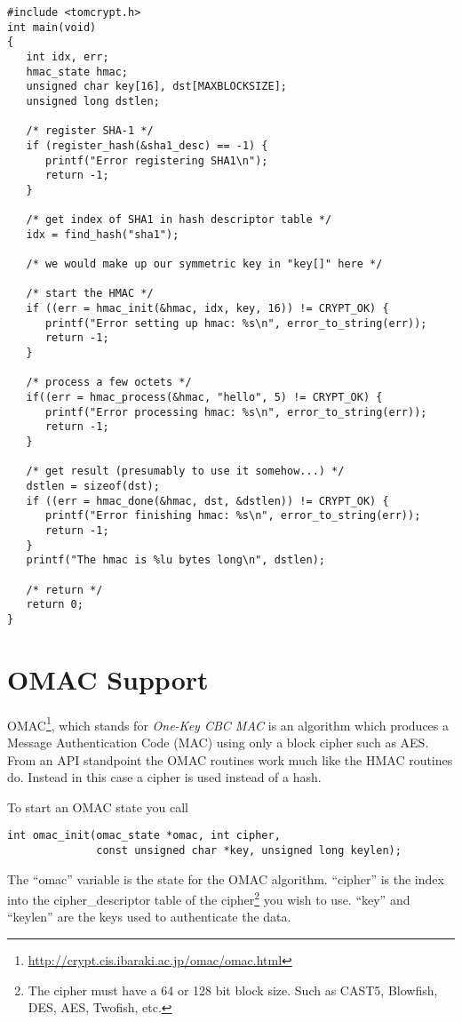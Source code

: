 \documentclass[a4paper]{book}
\begin{document}
\begin{small}
\begin{verbatim}
#include <tomcrypt.h>
int main(void)
{
   int idx, err;
   hmac_state hmac;
   unsigned char key[16], dst[MAXBLOCKSIZE];
   unsigned long dstlen;

   /* register SHA-1 */
   if (register_hash(&sha1_desc) == -1) {
      printf("Error registering SHA1\n");
      return -1;
   }

   /* get index of SHA1 in hash descriptor table */
   idx = find_hash("sha1");

   /* we would make up our symmetric key in "key[]" here */

   /* start the HMAC */
   if ((err = hmac_init(&hmac, idx, key, 16)) != CRYPT_OK) {
      printf("Error setting up hmac: %s\n", error_to_string(err));
      return -1;
   }

   /* process a few octets */
   if((err = hmac_process(&hmac, "hello", 5) != CRYPT_OK) {
      printf("Error processing hmac: %s\n", error_to_string(err));
      return -1;
   }

   /* get result (presumably to use it somehow...) */
   dstlen = sizeof(dst);
   if ((err = hmac_done(&hmac, dst, &dstlen)) != CRYPT_OK) {
      printf("Error finishing hmac: %s\n", error_to_string(err));
      return -1;
   }
   printf("The hmac is %lu bytes long\n", dstlen);
  
   /* return */
   return 0;
}
\end{verbatim}
\end{small}

\section{OMAC Support}
OMAC\footnote{\url{http://crypt.cis.ibaraki.ac.jp/omac/omac.html}}, which stands for \textit{One-Key CBC MAC} is an 
algorithm which produces a Message Authentication Code (MAC) using only a block cipher such as AES.  From an API 
standpoint the OMAC routines work much like the HMAC routines do.  Instead in this case a cipher is used instead of a hash.  

To start an OMAC state you call
\begin{verbatim}
int omac_init(omac_state *omac, int cipher, 
              const unsigned char *key, unsigned long keylen);
\end{verbatim}
The ``omac'' variable is the state for the OMAC algorithm.  ``cipher'' is the index into the cipher\_descriptor table
of the cipher\footnote{The cipher must have a 64 or 128 bit block size.  Such as CAST5, Blowfish, DES, AES, Twofish, etc.} you
wish to use.  ``key'' and ``keylen'' are the keys used to authenticate the data.
\end{document}
